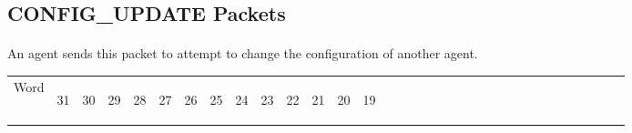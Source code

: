 \documentclass[11pt]{article}
\begin{document}
\subsection {CONFIG\_UPDATE Packets}
\paragraph{}
An agent sends this packet to attempt to change the configuration of another agent.
\newline
\begin{table}[h]
    \centering
    \label{tab:configUpdateDef}
    \begin{tabular}{|p{1cm}|m{0.04cm}|m{0.04cm}|m{0.04cm}|m{0.04cm}|m{0.04cm}|m{0.04cm}|m{0.04cm}|m{0.04cm}|m{0.04cm}|
        m{0.04cm}|m{0.04cm}|m{0.04cm}|m{0.04cm}|m{0.04cm}|m{0.04cm}|m{0.04cm}|m{0.04cm}|m{0.04cm}|m{0.04cm}|m{0.04cm}|
        m{0.04cm}|m{0.04cm}|m{0.04cm}|m{0.04cm}|m{0.04cm}|m{0.04cm}|m{0.04cm}|m{0.04cm}|m{0.04cm}|m{0.04cm}|m{0.04cm}|m{0.04cm}|}
        \hline
        Word & 
        \begin{sideways}31\end{sideways} &
        \begin{sideways}30\end{sideways} & 
        \begin{sideways}29\end{sideways} &
        \begin{sideways}28\end{sideways} &
        \begin{sideways}27\end{sideways} &
        \begin{sideways}26\end{sideways} &
        \begin{sideways}25\end{sideways} &
        \begin{sideways}24\end{sideways} &
        \begin{sideways}23\end{sideways} &
        \begin{sideways}22\end{sideways} &
        \begin{sideways}21\end{sideways} &
        \begin{sideways}20\end{sideways} &
        \begin{sideways}19\end{sideways} &

\end{tabular}
\end{table}
\end{document}

